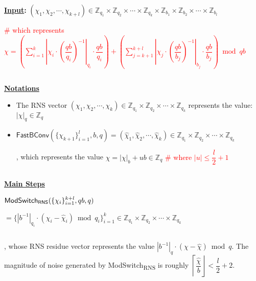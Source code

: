 \begin{tcolorbox}[title={\textbf{\tboxlabel{\ref*{subsec:rns-modswitch}} \textsf{ModSwitch\textsubscript{RNS}}}}]


\textbf{\underline{Input}:} $(\chi_1, \chi_2, \cdots, \chi_{k+l}) \in \mathbb{Z}_{q_1} \times \mathbb{Z}_{q_2} \times \cdots \times \mathbb{Z}_{q_k} \times \mathbb{Z}_{b_1} \times \mathbb{Z}_{b_2} \times \cdots \times \mathbb{Z}_{b_l} $ 

\textcolor{red}{ \# which represents $\chi = \left(\sum\limits_{i=1}^{k}\left|\chi_i\cdot\left(\dfrac{qb}{q_i}\right)^{-1}\right|_{q_i}\cdot\dfrac{qb}{q_i}\right) + \left(\sum\limits_{j=k+1}^{k+l}\left|\chi_j\cdot\left(\dfrac{qb}{b_j}\right)^{-1}\right|_{b_j}\cdot\dfrac{qb}{b_j}\right) \bmod qb$} 

$ $

\textbf{\underline{Notations}}

\begin{itemize}

\item The RNS vector $(\chi_{1}, \chi_{2}, \cdots, \chi_{k}) \in \mathbb{Z}_{q_1} \times \mathbb{Z}_{q_2} \times \cdots \times \mathbb{Z}_{q_k}$ represents the value: $|\chi|_q \in \mathbb{Z}_q$

\item $\textsf{FastBConv}(\{\chi_{k+1}\}_{i=1}^{l}, b, q) = (\hat{\chi}_1, \hat{\chi}_2, \cdots, \hat{\chi}_k) \in \mathbb{Z}_{q_1} \times \mathbb{Z}_{q_2} \times \cdots \times \mathbb{Z}_{q_k}$ 

, which represents the value $\hat{\chi} = |\chi|_b + ub \in \mathbb{Z}_q$ \textcolor{red}{ \# where $|u| \leq \dfrac{l}{2}+1$}

\end{itemize}

$ $


\textbf{\underline{Main Steps}}


$\textsf{ModSwitch\textsubscript{RNS}}(\{\chi_i\}_{i=1}^{k+l}, qb, q)$


$= \{|b^{-1}|_{q_i}\cdot (\chi_i - \hat{\chi}_i) \bmod q_i\}_{i=1}^{k} \in \mathbb{Z}_{q_1} \times \mathbb{Z}_{q_2} \times \cdots \times \mathbb{Z}_{q_k}$ 

$ $

, whose RNS residue vector represents the value $|b^{-1}|_{q} \cdot (\chi - \hat{\chi}) \bmod q$. The magnitude of noise generated by \textsf{ModSwitch\textsubscript{RNS}} is roughly $\left\lceil\dfrac{\hat{\chi}}{b}\right\rfloor < \dfrac{l}{2} + 2$.

\end{tcolorbox}

